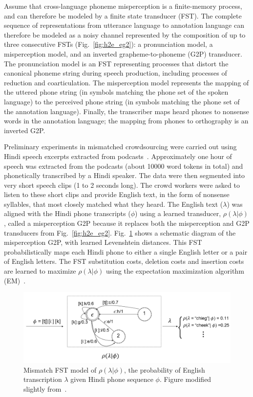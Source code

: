 Assume that cross-language phoneme misperception is a finite-memory
process, and can therefore be modeled by a finite state transducer
(FST).  The complete sequence of representations from utterance
language to annotation language can therefore be modeled as a noisy
channel represented by the composition of up to three consecutive FSTs
(Fig.~\ref{fig:h2e_eg2}): a pronunciation model, a misperception
model, and an inverted grapheme-to-phoneme (G2P) transducer.  The
pronunciation model is an FST representing processes that distort the
canonical phoneme string during speech production, including processes
of reduction and coarticulation.  The misperception model represents
the mapping of the uttered phone string (in symbols matching the
phone set of the spoken language) to the perceived phone string (in
symbols matching the phone set of the annotation language).  Finally,
the transcriber maps heard phones to nonsense words in the annotation
language; the mapping from phones to orthography is an inverted G2P.

Preliminary experiments in mismatched crowdsourcing were carried
out\cite{JHJ15a} using Hindi speech excerpts extracted from
podcasts~\cite{SBS}.  Approximately one hour of speech was extracted
from the podcasts (about 10000 word tokens in total) and phonetically
transcribed by a Hindi speaker. The data were then segmented into very
short speech clips (1 to 2 seconds long). The crowd workers were asked
to listen to these short clips and provide English text, in the form
of nonsense syllables, that most closely matched what they heard. The
English text ($\lambda$) was aligned with the Hindi phone transcripts
($\phi$) using a learned transducer, $\rho(\lambda|\phi)$, called a
misperception G2P because it replaces both the misperception and G2P
transducers from Fig.~\ref{fig:h2e_eg2}.  Fig.~\ref{fig:channelfst}
shows a schematic diagram of the misperception G2P, with learned
Levenshtein distances. This FST probabilistically maps each Hindi
phone to either a single English letter or a pair of English
letters. The FST substitution costs, deletion costs and insertion
costs are learned to maximize $\rho(\lambda|\phi)$ using the
expectation maximization algorithm (EM)~\cite{Dempster77}.
\begin{figure}[b!]
\centering
\includegraphics[width=\linewidth]{../figs/mismatchfst.png}
\caption{Mismatch FST model of $\rho(\lambda|\phi)$, the probability
  of English transcription $\lambda$ given Hindi phone sequence
  $\phi$.  Figure modified slightly
  from~\cite{JHJ15a}.\label{fig:channelfst}}
\end{figure}

